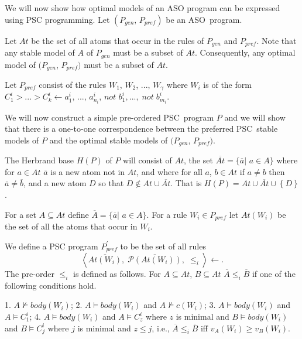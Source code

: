 \documentclass[letterpaper]{article}\usepackage{aaai}
\begin{document}
We will now show how optimal models of an ASO program can be expressed using
PSC programming. Let $\left(  P_{gen}\text{, }P_{pref}\right)  $ be an
ASO\ program.


Let $At$ be the set of all atoms that occur in the rules of $P_{gen}$ and
$P_{pref}$. Note that any stable model of $A$ of $P_{gen}$ must be a subset of
$At$. Consequently, any optimal model of $(P_{gen}$, $P_{pref})$ must be a
subset of $At$.

Let $P_{pref}$ consist of the rules $W_{1}$, $W_{2}$, ..., $W_{\gamma}$ where
$W_{i}$ is of the form $C_{1}^{i}>...>C_{k}^{i}\leftarrow a_{1}^{i}$, ...,
$a_{n_{i}}^{i}$, $not$ $b_{1}^{i},...,\;not\;b_{m_{i}}^{i}$.

We will now construct a simple pre-ordered PSC\ program $P$ and we will show
that there is a one-to-one correspondence between the preferred PSC\ stable
models of $P $ and the optimal stable models of $(P_{gen}$, $P_{pref})$.

The Herbrand base $H\left(  P\right)  $ of $P$ will consist of $At$, the set
$\overline{At}=\{\overline{a}|$ $a\in A\}$ where for $a\in At$ $\overline{a}$
is a new atom not in $At$, and where for all $a$, $b\in At$ if $a\neq b$ then
$\overline{a}\neq\overline{b}$, and a new atom $D$ so that $D\notin
At\cup\overline{At}$. That is $H\left(  P\right)  =At\cup\overline{At}\cup\left\{  D\right\}  $.

For a set $A\subseteq At$ define $\overline{A}=\{\overline{a}|$ $a\in A\}$.
For a rule $W_{i}\in P_{pref}$ let $At\left(  W_{i}\right)  $ be the set of
all the atoms that occur in $W_{i}$.

We define a PSC program $P_{pref}^{\prime}$ to be the set of all rules
\[
\left\langle \overline{At\left(  W_{i}\right)  },\;\overline{\mathcal{P}\left(  At\left(  W_{i}\right)  \right)  },\;\leq_{i}\right\rangle
\leftarrow.
\]
The pre-order $\leq_{i}$ is defined as follows. For $A\subseteq At$,
$B\subseteq At$ $\overline{A}\leq_{i}\overline{B}$ if one of the following
conditions hold.

1. $A\not \models body\left(  W_{i}\right)  $; 2. $A\models body\left(
W_{i}\right)  $ and $A\not \models c\left(  W_{i}\right)  $; 3. $A\models
body\left(  W_{i}\right)  $ and $A\models C_{1}^{i}$; 4. $A\models body\left(
W_{i}\right)  $ and $A\models C_{z}^{i}$ where $z$ is minimal and $B\models
body\left(  W_{i}\right)  $ and $B\models C_{j}^{i}$ where $j$ is minimal and
$z\leq j$, i.e., $\overline{A}\leq_{i}\overline{B}$ iff $v_{A}\left(
W_{i}\right)  \geq v_{B}\left(  W_{i}\right)  $.
\end{document}
